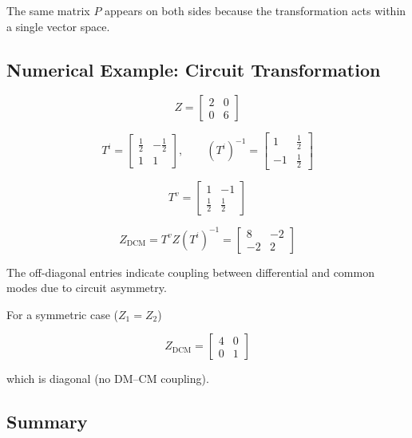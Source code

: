 The same matrix $P$ appears on both sides because the transformation
acts within a single vector space.

\subsection{Numerical Example: Circuit Transformation}
\label{sec:numerical-circuit}

\[
Z =
\begin{bmatrix}
2 & 0\\
0 & 6
\end{bmatrix}
\]

\[
T^i =
\begin{bmatrix}
\frac12 & -\frac12\\
1 & 1
\end{bmatrix},
\qquad
(T^i)^{-1} =
\begin{bmatrix}
1 & \frac12\\
-1 & \frac12
\end{bmatrix}
\]

\[
T^v =
\begin{bmatrix}
1 & -1\\
\frac12 & \frac12
\end{bmatrix}
\]

\[
Z_{\text{DCM}}
=
T^v Z (T^i)^{-1}
=
\begin{bmatrix}
8 & -2\\
-2 & 2
\end{bmatrix}
\]

The off-diagonal entries indicate coupling between differential and
common modes due to circuit asymmetry.

For a symmetric case ($Z_1 = Z_2$)

\[
Z_{\text{DCM}} =
\begin{bmatrix}
4 & 0\\
0 & 1
\end{bmatrix}
\]

which is diagonal (no DM–CM coupling).

\subsection{Summary}
\label{sec:summary}

